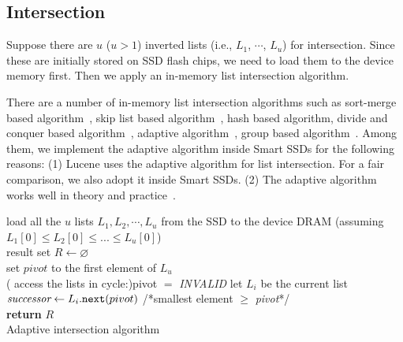 \subsection{Intersection}\label{sec:intersection}
Suppose there are $u$ ($u>1$) inverted lists (i.e., $L_1$, $\cdots$, $L_u$) for intersection. Since these are initially stored on SSD flash chips, we need to load them to the device memory first. Then we apply an in-memory list intersection algorithm.

There are a number of in-memory list intersection algorithms such as sort-merge based algorithm~\cite{GarciaMolina2008}, skip list based algorithm~\cite{M08}, hash based algorithm, divide and conquer based algorithm~\cite{Baezayates05}, adaptive algorithm~\cite{Demaine2000ASI}, group based algorithm~\cite{Ding2011}. Among them, we implement the adaptive algorithm inside Smart SSDs for the following reasons: (1) Lucene uses the adaptive algorithm for list intersection. For a fair comparison, we also adopt it inside Smart SSDs. (2) The adaptive algorithm works well in theory and practice~\cite{Demaine2000ASI,Ding2011}. %

 \begin{algorithm}[tbp]\small
load all the $u$ lists $L_1, L_2, \cdots, L_u$ from the SSD to the device DRAM (assuming $L_1[0] \le L_2[0] \le ... \le L_u[0]$)\\
result set $R \leftarrow \varnothing$\\
set $pivot$ to the first element of $L_u$ \\

 \Repeat( access the lists in cycle:){pivot $=$ \emph{INVALID}}{
 let $L_i$ be the current list \\
 $\emph{successor} \leftarrow L_i.\texttt{next}(pivot)$ /*smallest element $\ge$ \emph{pivot}*/\\
 }
 \textbf{return} $R$\\
 \caption{Adaptive intersection algorithm}\label{alg:AdaptiveIntersection}
 \end{algorithm}

